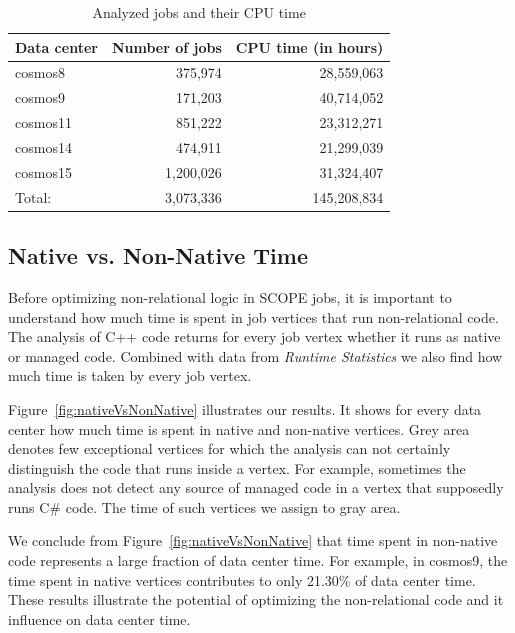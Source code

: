 \begin{table}[ht]
\centering
\begin{tabular}{lrr}

  Data center & Number of jobs & CPU time (in hours) \\
 \midrule
cosmos8 & 375,974 & 28,559,063 \\
cosmos9 & 171,203 & 40,714,052 \\
cosmos11 & 851,222 & 23,312,271\\
cosmos14 & 474,911 & 21,299,039\\
cosmos15 & 1,200,026 & 31,324,407 \\
\midrule
Total: & 3,073,336 & 145,208,834\\
\midrule

\end{tabular}
 \label{tb:projects}
 \caption{Analyzed jobs and their CPU time}
\end{table}




\subsection{Native vs. Non-Native Time}
Before optimizing non-relational logic in SCOPE jobs, it is important to understand how much time is spent in job vertices that run non-relational code. The analysis of C++ code returns for every job vertex whether it runs as native or managed code. Combined with data from \emph{Runtime Statistics} we also find how much time is taken by every job vertex.

Figure~\ref{fig:nativeVsNonNative} illustrates our results. It shows for every data center how much time is spent in native and non-native vertices. Grey area denotes few exceptional vertices for which the analysis can not certainly distinguish the code that runs inside a vertex. For example, sometimes the analysis does not detect any source of managed code in a vertex that supposedly runs C\# code. The time of such vertices we assign to gray area.

We conclude from Figure~\ref{fig:nativeVsNonNative} that time spent in non-native code represents a large fraction of data center time. For example, in cosmos9, the time spent in native vertices contributes to only 21.30\% of data center time. These results illustrate the potential of optimizing the non-relational code and it influence on data center time.


